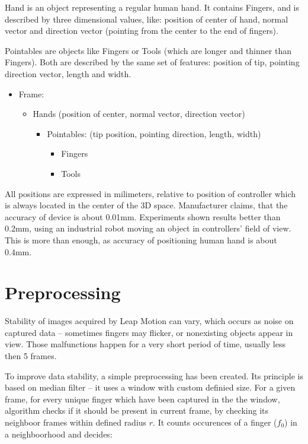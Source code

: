 Hand is an object representing a regular human hand. It contains Fingers, and is described by three dimensional values, like: position of center of hand, normal vector and direction vector (pointing from the center to the end of fingers). 

Pointables are objects like Fingers or Tools (which are longer and thinner than Fingers). Both are described by the same set of features: position of tip, pointing direction vector, length and width.

\begin{itemize}
	\item Frame:
	\begin{itemize}
		\item Hands (position of center, normal vector, direction vector)
			\begin{itemize}
				\item Pointables: (tip position, pointing direction, length, width)
				\begin{itemize}
					\item Fingers
					\item Tools
				\end{itemize}
			\end{itemize}
	\end{itemize}
\end{itemize}

All positions are expressed in milimeters, relative to position of controller which is always located in the center of the 3D space. Manufacturer claims, that the accuracy of device is about 0.01mm. Experiments shown results better than 0.2mm, using an industrial robot moving an object in controllers' field of view. This is more than enough, as accuracy of positioning human hand is about 0.4mm. \cite{lmAN} 

\section{Preprocessing} \label{PreprocessingSection}

Stability of images acquired by Leap Motion can vary, which occurs as noise on captured data -- sometimes fingers may flicker, or nonexisting objects appear in view. Those malfunctions happen for a very short period of time, usually less then 5 frames. 

To improve data stability, a simple preprocessing has been created. Its principle is based on median filter -- it uses a window with custom definied size. For a given frame, for every unique finger which have been captured in the the window, algorithm checks if it should be present in current frame, by checking its neighboor frames within defined radius $r$. It counts occurences of a finger ($f_0$) in a neighboorhood and decides:

